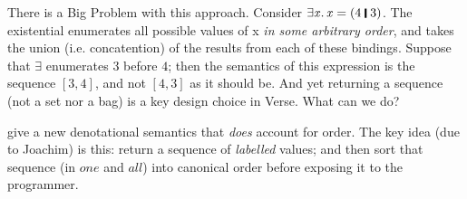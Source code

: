 \documentclass[acmsmall,review,dvipsnames]{acmart}
\newcommand{\Varid}[1]{\mathit{#1}}
\newcommand{\mone}{\mathit{one}}
\newcommand{\mall}{\mathit{all}}
\begin{document}
There is a Big Problem with this approach.  Consider \ensuremath{\exists\Varid{x}.\,\Varid{x}\mathrel{=}(\mathrm{4}\;\rule[-0.1em]{0.15em}{0.75em}\;\mathrm{3})}.  The existential
enumerates all possible values of x \emph{in some arbitrary order}, and takes the union (i.e. concatention)
of the results from each of these bindings.  Suppose that \ensuremath{\exists{}} enumerates \ensuremath{\mathrm{3}} before \ensuremath{\mathrm{4}}; then
the semantics of this expression is the sequence $[3,4]$, and not $[4,3]$ as it should be.
And yet returning a sequence (not a set nor a bag) is a key design choice in Verse.  What can we do?

 give a new denotational semantics that \emph{does} account for order.
The key idea (due to Joachim) is this: return a sequence of \emph{labelled} values;
and then sort that sequence (in $\mone$ and $\mall$) into canonical order
before exposing it to the programmer.
\end{document}
